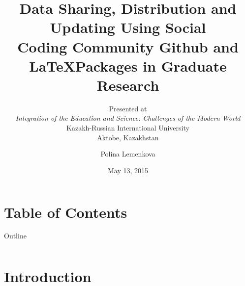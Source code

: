 \documentclass[pdflatex,compress,8pt,
	xcolor={dvipsnames,dvipsnames,svgnames,x11names,table},
	hyperref={
	breaklinks = true, 
	pdfauthor={Lemenkova Polina}, 
	pdfsubject={Preentation}, 
	pdfcreator={Lemenkova Polina}, 
	pdfproducer={Lemenkova Polina}, 
	colorlinks=true,linkcolor=blue, 
	citecolor=NavyBlue, 
	urlcolor = NavyBlue, 
	breaklinks = true}]{beamer}
\title[\tiny{Data Sharing, Distribution and Updating Using ... Github and \LaTeX}]{\large{Data Sharing, Distribution and Updating Using Social \\Coding Community Github and \LaTeX \space Packages in Graduate Research}}
\subtitle{Presented at \\
\emph{Integration of the Education and Science: Challenges of the Modern World}\\
Kazakh-Russian International University\\
Aktobe, Kazakhstan}
\author[Polina Lemenkova]{Polina Lemenkova}
\date{May 13, 2015}
\begin{document}
\maketitle


\section*{Table of Contents}
\begin{frame}{Outline}
    \begin{columns}[onlytextwidth,T]
        \begin{column}{.6\textwidth}
            \footnotesize{\tableofcontents[sections=1-6]}
        \end{column}
        \begin{column}{.4\textwidth}
            \footnotesize{\tableofcontents[sections=7-14]}
        \end{column}
    \end{columns}
\end{frame}

\section{Introduction}
\end{document}
